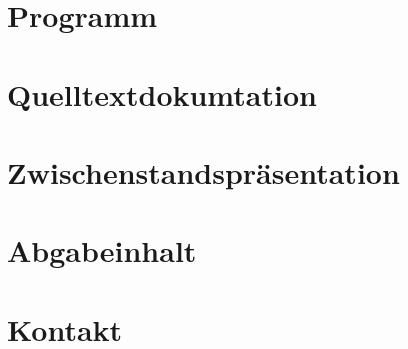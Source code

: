 \section{Programm}
\section{Quelltextdokumtation}
\section{Zwischenstandspräsentation}
\section{Abgabeinhalt}
\section{Kontakt}